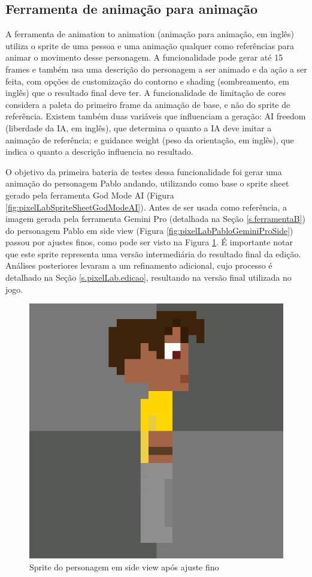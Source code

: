 \FloatBarrier
\subsection{Ferramenta de animação para animação}
\label{s.pixelLab.animacao}

A ferramenta de animation to animation (animação para animação, em inglês) utiliza o sprite de uma pessoa e uma animação qualquer como referências para animar o movimento desse personagem. A funcionalidade pode gerar até 15 frames e também usa uma descrição do personagem a ser animado e da ação a ser feita, com opções de customização do contorno e shading (sombreamento, em inglês) que o resultado final deve ter. A  funcionalidade de limitação de cores considera a paleta do primeiro frame da animação de base, e não do sprite de referência. Existem também duas variáveis que influenciam a geração: AI freedom (liberdade da IA, em inglês), que determina o quanto a IA deve imitar a animação de referência; e guidance weight (peso da orientação, em inglês), que indica o quanto a descrição influencia no resultado.

O objetivo da primeira bateria de testes dessa funcionalidade foi gerar uma animação do personagem Pablo andando, utilizando como base o sprite sheet gerado pela ferramenta God Mode AI (Figura \ref{fig:pixelLabSpriteSheetGodModeAI}). Antes de ser usada como referência, a imagem gerada pela ferramenta Gemini Pro (detalhada na Seção \ref{s.ferramentaB}) do personagem Pablo em side view (Figura \ref{fig:pixelLabPabloGeminiProSide}) passou por ajustes finos, como pode ser visto na Figura \ref{fig:pixelLabAniSideViewSprite1}. É importante notar que este sprite representa uma versão intermediária do resultado final da edição. Análises posteriores levaram a um refinamento adicional, cujo processo é detalhado na Seção \ref{s.pixelLab.edicao}, resultando na versão final utilizada no jogo.

\begin{figure}[htbp]
    \centering
    \caption{\small Sprite do personagem em side view após ajuste fino}
    \label{fig:pixelLabAniSideViewSprite1}
    \includegraphics[width=0.4\linewidth]{figs/pixelLab/dia3/fixGrande.PNG}
\end{figure}

